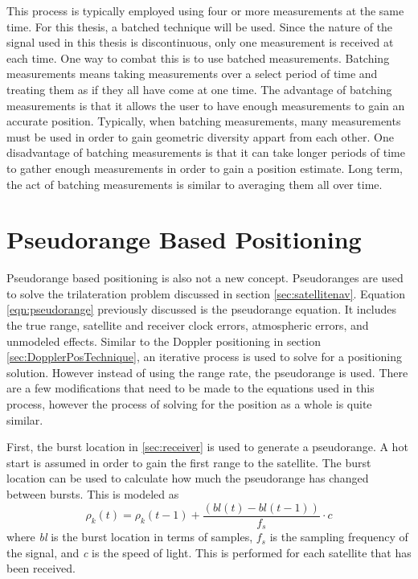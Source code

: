 \documentclass[12pt]{report}
\begin{document}
This process is typically employed using four or more measurements at the same time. For this thesis, a batched technique will be used. Since the nature of the signal used in this thesis is discontinuous, only one measurement is received at each time. One way to combat this is to use batched measurements. Batching measurements means taking measurements over a select period of time and treating them as if they all have come at one time. The advantage of batching measurements is that it allows the user to have enough measurements to gain an accurate position. Typically, when batching measurements, many measurements must be used in order to gain geometric diversity appart from each other. One disadvantage of batching measurements is that it can take longer periods of time to gather enough measurements in order to gain a position estimate. Long term, the act of batching measurements is similar to averaging them all over time. 

\section{Pseudorange Based Positioning} \label{sec:PseudorangePosTechnique}
Pseudorange based positioning is also not a new concept. Pseudoranges are used to solve the trilateration problem discussed in section \ref{sec:satellitenav}. Equation \ref{eqn:pseudorange} previously discussed is the pseudorange equation. It includes the true range, satellite and receiver clock errors, atmospheric errors, and unmodeled effects. Similar to the Doppler positioning in section \ref{sec:DopplerPosTechnique}, an iterative process is used to solve for a positioning solution. However instead of using the range rate, the pseudorange is used. There are a few modifications that need to be made to the equations used in this process, however the process of solving for the position as a whole is quite similar. 

First, the burst location in \ref{sec:receiver} is used to generate a pseudorange. A hot start is assumed in order to gain the first range to the satellite. The burst location can be used to calculate how much the pseudorange has changed between bursts. This is modeled as 
\begin{equation}
    \rho_{k}(t) = \rho_{k}(t-1) + \frac{(bl(t) - bl(t-1))}{f_s} \cdot c
    \label{eqn:pseudocalc}
\end{equation}
where \textit{bl} is the burst location in terms of samples, $f_s$ is the sampling frequency of the signal, and \textit{c} is the speed of light. This is performed for each satellite that has been received.
\end{document}

